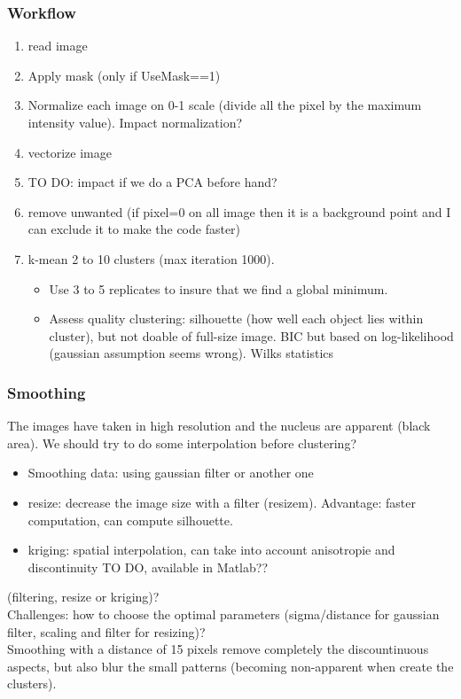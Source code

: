 \documentclass[]{article}
\begin{document}
\subsubsection{Workflow}
\begin{enumerate}
	\item read image
	\item Apply mask (only if UseMask==1)
	\item Normalize each image on 0-1 scale (divide all the pixel by the maximum intensity value). {\color{blue} Impact normalization?}
	\item vectorize image
	\item {TO DO: impact if we do a PCA before hand?}
	\item remove unwanted (if pixel=0 on all image then it is a background point and I can exclude it to make the code faster)
	\item k-mean 2 to 10 clusters (max iteration 1000). 
	\begin{itemize}
		\item Use 3 to 5 replicates to insure that we find a global minimum.
		\item Assess quality clustering: silhouette (how well each object lies within cluster), but not doable of full-size image. BIC but based on log-likelihood (gaussian assumption seems wrong). Wilks statistics 
		
	\end{itemize} 
\end{enumerate}
\subsubsection{Smoothing}
The images have taken in high resolution and the nucleus are apparent (black area). We should try to do some interpolation before clustering?
\begin{itemize}
	\item Smoothing data: using gaussian filter or another one 
	\item resize: decrease the image size with a filter (resizem). Advantage: faster computation, can compute silhouette. 
	\item kriging: spatial interpolation, can take into account anisotropie and discontinuity {\color{blue} TO DO, available in Matlab?? }
\end{itemize}(filtering, resize or kriging)?\\
Challenges: how to choose the optimal parameters (sigma/distance for gaussian filter, scaling and filter for resizing)?\\
Smoothing with a distance of 15 pixels remove completely the discountinuous aspects, but also blur the small patterns (becoming non-apparent when create the clusters).
\end{document}
